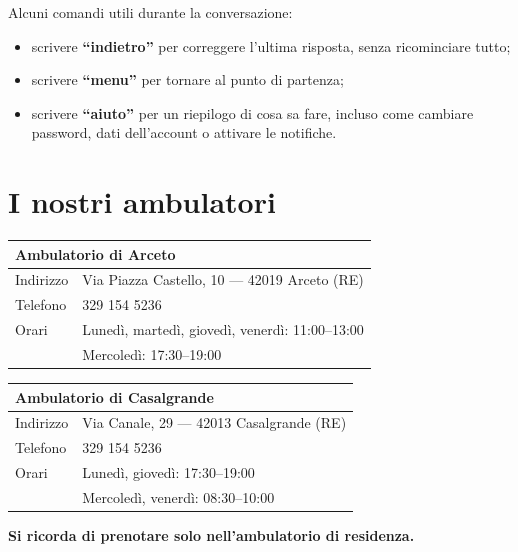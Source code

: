 \documentclass[11pt,a4paper]{article}
\begin{document}
Alcuni comandi utili durante la conversazione:
\begin{itemize}
  \item scrivere \textbf{``indietro''} per correggere l'ultima risposta, senza ricominciare tutto;
  \item scrivere \textbf{``menu''} per tornare al punto di partenza;
  \item scrivere \textbf{``aiuto''} per un riepilogo di cosa sa fare, incluso come cambiare password, dati dell'account o attivare le notifiche.
\end{itemize}

\section{I nostri ambulatori}

\begin{center}
\begin{tabularx}{\linewidth}{lX}
\toprule
\multicolumn{2}{l}{\textbf{Ambulatorio di Arceto}} \\
\midrule
Indirizzo & Via Piazza Castello, 10 --- 42019 Arceto (RE) \\
Telefono & 329 154 5236 \\
Orari & Lunedì, martedì, giovedì, venerdì: 11:00--13:00 \\
       & Mercoledì: 17:30--19:00 \\
\bottomrule
\end{tabularx}

\vspace{1em}

\begin{tabularx}{\linewidth}{lX}
\toprule
\multicolumn{2}{l}{\textbf{Ambulatorio di Casalgrande}} \\
\midrule
Indirizzo & Via Canale, 29 --- 42013 Casalgrande (RE) \\
Telefono & 329 154 5236 \\
Orari & Lunedì, giovedì: 17:30--19:00 \\
       & Mercoledì, venerdì: 08:30--10:00 \\
\bottomrule
\end{tabularx}
\end{center}

\textbf{Si ricorda di prenotare solo nell'ambulatorio di residenza.}
\end{document}
